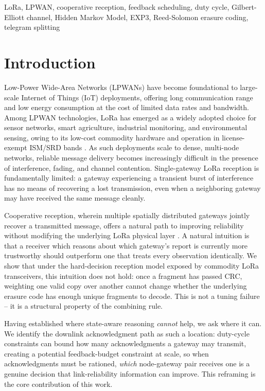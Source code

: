 \documentclass[journal]{IEEEtran}
\begin{document}
\begin{IEEEkeywords}
LoRa, LPWAN, cooperative reception, feedback scheduling, duty cycle, Gilbert-Elliott channel, Hidden Markov Model, EXP3, Reed-Solomon erasure coding, telegram splitting
\end{IEEEkeywords}

\section{Introduction}

Low-Power Wide-Area Networks (LPWANs) have become foundational to large-scale Internet of Things (IoT) deployments, offering long communication range and low energy consumption at the cost of limited data rates and bandwidth. Among LPWAN technologies, LoRa has emerged as a widely adopted choice for sensor networks, smart agriculture, industrial monitoring, and environmental sensing, owing to its low-cost commodity hardware and operation in license-exempt ISM/SRD bands \cite{ts2014}. As such deployments scale to dense, multi-node networks, reliable message delivery becomes increasingly difficult in the presence of interference, fading, and channel contention. Single-gateway LoRa reception is fundamentally limited: a gateway experiencing a transient burst of interference has no means of recovering a lost transmission, even when a neighboring gateway may have received the same message cleanly.

Cooperative reception, wherein multiple spatially distributed gateways jointly recover a transmitted message, offers a natural path to improving reliability without modifying the underlying LoRa physical layer \cite{gw2022, pcube2021}. A natural intuition is that a receiver which reasons about which gateway's report is currently more trustworthy should outperform one that treats every observation identically. We show that under the hard-decision reception model exposed by commodity LoRa transceivers, this intuition does not hold: once a fragment has passed CRC, weighting one valid copy over another cannot change whether the underlying erasure code has enough unique fragments to decode. This is not a tuning failure -- it is a structural property of the combining rule.

Having established where state-aware reasoning \emph{cannot} help, we ask where it can. We identify the downlink acknowledgment path as such a location: duty-cycle constraints can bound how many acknowledgments a gateway may transmit, creating a potential feedback-budget constraint at scale, so when acknowledgments must be rationed, \emph{which} node-gateway pair receives one is a genuine decision that link-reliability information can improve. This reframing is the core contribution of this work.
\end{document}
